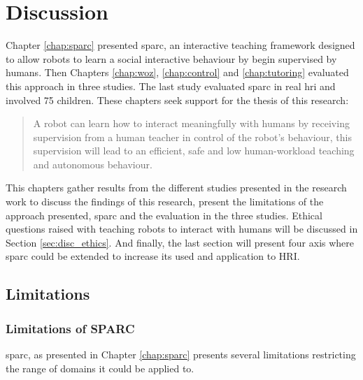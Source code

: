 \chapter{Discussion} \label{chap:discussion}
\glsresetall

Chapter \ref{chap:sparc} presented \gls{sparc}, an interactive teaching framework designed to allow robots to learn a social interactive behaviour by begin supervised by humans. Then Chapters \ref{chap:woz}, \ref{chap:control} and \ref{chap:tutoring} evaluated this approach in three studies. The last study evaluated \gls{sparc} in real \gls{hri} and involved 75 children. These chapters seek support for the thesis of this research:

\begin{quote}
	A robot can learn how to interact meaningfully with humans by receiving supervision from a human teacher in control of the robot's behaviour, this supervision will lead to an efficient, safe and low human-workload teaching and autonomous behaviour.	
\end{quote}

This chapters gather results from the different studies presented in the research work to discuss the findings of this research, present the limitations of the approach presented, \gls{sparc} and the evaluation in the three studies. Ethical questions raised with teaching robots to interact with humans will be discussed in Section \ref{sec:disc_ethics}. And finally, the last section will present four axis where \gls{sparc} could be extended to increase its used and application to \gls{HRI}.

\section{Limitations} \label{sec:disc_limitations}

\subsection{Limitations of SPARC}

\gls{sparc}, as presented in Chapter \ref{chap:sparc} presents several limitations restricting the range of domains it could be applied to.

